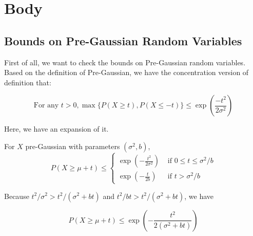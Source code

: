 

\section{Body}

\subsection{Bounds on Pre-Gaussian Random Variables}
First of all, we want to check the bounds on Pre-Gaussian random variables.
Based on the definition of Pre-Gaussian, we have the concentration version of definition that:
\begin{theorem}
  \begin{equation}
    \text{For any } t>0, \max \{P(X \geq t), P(X \leq -t) \} \leq \exp(\frac{-t^2}{2 \sigma^2})
  \end{equation}
\end{theorem}

Here, we have an expansion of it.

\begin{lemma} \cite*{Bartlett:2020}
  For $X$ pre-Gaussian with parameters $(\sigma^2, b)$,
  \begin{equation}
    P(X \geq \mu+t) \leq\left\{\begin{array}{ll}
    \exp \left(-\frac{t^{2}}{2 \sigma^{2}}\right) & \text { if } 0 \leq t \leq \sigma^{2} / b \\
    \exp \left(-\frac{t}{2 b}\right) & \text { if } t>\sigma^{2} / b
    \end{array}\right.
  \end{equation}
\end{lemma}

Because $t^2/ \sigma^2 > t^2/ (\sigma^2 + bt)$ and $t^2/ bt > t^2/ (\sigma^2 + bt)$, we have

\begin{equation}
  P(X \geq \mu+t) \leq 
  \exp \left(-\frac{t^{2}}{2 (\sigma^2 + bt)}\right) 
\end{equation}


